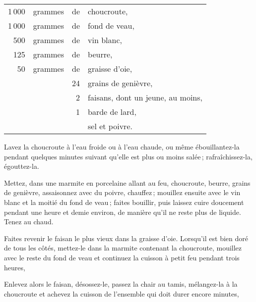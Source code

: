 \footnotesize
\begin{longtable}{rrrp{16em}}
  1 000 & grammes & de & choucroute,                                                                      \\
  1 000 & grammes & de & fond de veau,                                                                    \\
    500 & grammes & de & vin blanc,                                                                       \\
    125 & grammes & de & beurre,                                                                          \\
     50 & grammes & de & graisse d'oie,                                                                   \\
        &         & 24 & grains de genièvre,                                                              \\
        &         &  2 & faisans, dont un jeune, au moins,                                                \\
        &         &  1 & barde de lard,                                                                   \\
        &         &    & sel et poivre.                                                                   \\
\end{longtable}
\normalsize

Lavez la choucroute à l’eau froide ou à l'eau chaude, ou même ébouillantez-la
pendant quelques minutes suivant qu'elle est plus ou moins salée ;
rafraîchissez-la, égouttez-la.

Mettez, dans une marmite en porcelaine allant au feu, choucroute, beurre,
grains de genièvre, assaisonnez avec du poivre, chauffez ; mouillez ensuite
avec le vin blanc et la moitié du fond de veau ; faites bouillir, puis laissez
cuire doucement pendant une heure et demie environ, de manière qu'il ne reste
plus de liquide. Tenez au chaud.

Faites revenir le faisan le plus vieux dans la graisse d’oie. Lorsqu'il est bien doré
de tous les côtés, mettez-le dans la marmite contenant la choucroute, mouillez avec
le reste du fond de veau et continuez la cuisson à petit feu pendant trois heures,

Enlevez alors le faisan, désossez-le, passez la chair au tamis, mélangez-la
à la choucroute et achevez la cuisson de l’ensemble qui doit durer encore
{\mmm} minutes,

